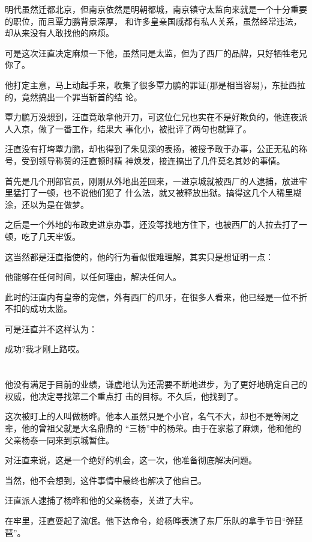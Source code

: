 \documentclass[11pt,a4paper,onecolumn]{article}
\begin{document}
明代虽然迁都北京，但南京依然是明朝都城，南京镇守太监向来就是一个十分重要的职位，而且覃力鹏背景深厚，
和许多皇亲国戚都有私人关系，虽然经常违法，却从来没有人敢找他的麻烦。

可是这次汪直决定麻烦一下他，虽然同是太监，但为了西厂的品牌，只好牺牲老兄你了。

他打定主意，马上动起手来，收集了很多覃力鹏的罪证(那是相当容易)，东扯西拉的，竟然搞出一个罪当斩首的结
论。

覃力鹏万没想到，汪直竟敢拿他开刀，可这位仁兄也实在不是好欺负的，他连夜派人入京，做了一番工作，结果大
事化小，被批评了两句也就算了。

汪直没有打垮覃力鹏，却也得到了朱见深的表扬，被授予敢于办事，公正无私的称号，受到领导称赞的汪直顿时精
神焕发，接连搞出了几件莫名其妙的事情。

首先是几个刑部官员，刚刚从外地出差回来，一进京城就被西厂的人逮捕，放进牢里猛打了一顿，也不说他们犯了
什么法，就又被释放出狱。搞得这几个人稀里糊涂，还以为是在做梦。

之后是一个外地的布政史进京办事，还没等找地方住下，也被西厂的人拉去打了一顿，吃了几天牢饭。

这当然都是汪直指使的，他的行为看似很难理解，其实只是想证明一点：

他能够在任何时间，以任何理由，解决任何人。

此时的汪直内有皇帝的宠信，外有西厂的爪牙，在很多人看来，他已经是一位不折不扣的成功太监。

可是汪直并不这样认为：

成功?我才刚上路哎。

\section[\thesection]{}

他没有满足于目前的业绩，谦虚地认为还需要不断地进步，为了更好地确定自己的权威，他决定寻找第二个重点打
击的目标。不久后，他找到了。

这次被盯上的人叫做杨晔。他本人虽然只是个小官，名气不大，却也不是等闲之辈，他的曾祖父就是大名鼎鼎的
``三杨''中的杨荣。由于在家惹了麻烦，他和他的父亲杨泰一同来到京城暂住。

对汪直来说，这是一个绝好的机会，这一次，他准备彻底解决问题。

当然，他不会想到，这件事情中最终也解决了他自己。

汪直派人逮捕了杨晔和他的父亲杨泰，关进了大牢。

在牢里，汪直耍起了流氓。他下达命令，给杨晔表演了东厂乐队的拿手节目``弹琵琶''。
\end{document}
